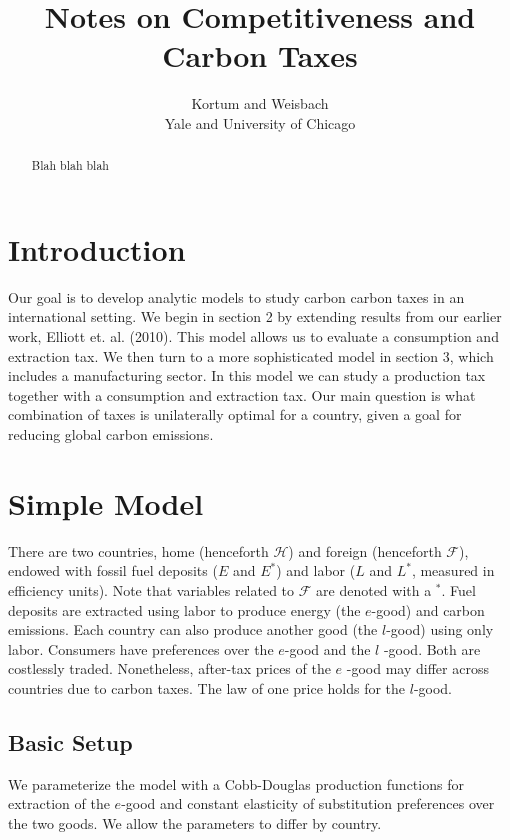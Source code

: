 \documentclass[notitlepage,12pt]{article}
\begin{document}
\title{Notes on Competitiveness and Carbon Taxes}
\author{Kortum and Weisbach \\
Yale and University of Chicago}
\maketitle

\begin{abstract}
Blah blah blah
\end{abstract}

\section{Introduction}

Our goal is to develop analytic models to study carbon carbon taxes in an
international setting. We begin in section 2 by extending results from our
earlier work, Elliott et. al. (2010). This model allows us to evaluate a
consumption and extraction tax. We then turn to a more sophisticated model
in section 3, which includes a manufacturing sector. In this model we can
study a production tax together with a consumption and extraction tax. Our
main question is what combination of taxes is unilaterally optimal for a
country, given a goal for reducing global carbon emissions.

\section{Simple Model}

There are two countries, home (henceforth $\mathcal{H}$) and foreign
(henceforth $\mathcal{F}$), endowed with fossil fuel deposits ($E$ and $%
E^{\ast }$) and labor ($L$ and $L^{\ast }$, measured in efficiency units).
Note that variables related to $\mathcal{F}$ are denoted with a $^{\ast }$.
Fuel deposits are extracted using labor to produce energy (the $e$-good) and
carbon emissions. Each country can also produce another good (the $l$-good)
using only labor. Consumers have preferences over the $e$-good and the $l$%
-good. Both are costlessly traded. Nonetheless, after-tax prices of the $e$%
-good may differ across countries due to carbon taxes. The law of one price
holds for the $l$-good.

\subsection{Basic Setup}

We parameterize the model with a Cobb-Douglas production functions for
extraction of the $e$-good and constant elasticity of substitution
preferences over the two goods. We allow the parameters to differ by country.
\end{document}
